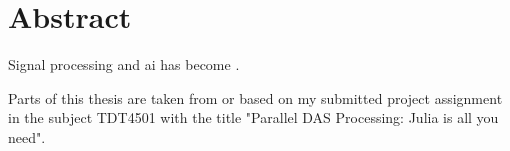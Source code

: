 \chapter*{Abstract}

Signal processing and \acrfull{ai} has become .

Parts of this thesis are taken from or based on my submitted project assignment in the subject TDT4501 with the title "Parallel DAS Processing: Julia is all you need".